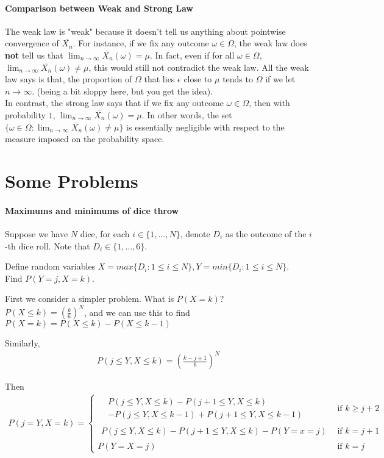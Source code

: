 \documentclass{article}
\begin{document}
\paragraph{Comparison between Weak and Strong Law}
The weak law is "weak" because it doesn't tell us anything about pointwise convergence of $\overline{X_n}$. For instance, if we fix any outcome $\omega \in \Omega$, the weak law does \textbf{not} tell us that $\lim_{n\rightarrow \infty}\overline{X_n}(\omega)=\mu$. In fact, even if for all $\omega \in \Omega$, $\lim_{n\rightarrow \infty}\overline{X_n}(\omega)\neq \mu$, this would still not contradict the weak law. All the weak law says is that, the proportion of $\Omega$ that lies $\epsilon$ close to $\mu$ tends to $\Omega$ if we let $n\rightarrow \infty$. (being a bit sloppy here, but you get the idea).
\\
In contrast, the strong law says that if we fix any outcome $\omega \in \Omega$, then with probability $1$, $\lim_{n\rightarrow \infty}\overline{X_n}(\omega)=\mu$. In other words, the set $\{\omega \in \Omega: \lim_{n\rightarrow \infty}\overline{X_n}(\omega) \neq \mu \}$ is essentially negligible with respect to the measure imposed on the probability space.



\section{Some Problems}
\paragraph{Maximums and minimums of dice throw}
Suppose we have $N$ dice, for each $i\in \{1,\dots,N\}$, denote $D_i$ as the outcome of the $i$-th dice roll. Note that $D_i\in \{1,\dots, 6\}$.

Define random variables $X=max\{D_i:1\leq i\leq N\}, Y=min\{D_i:1\leq i\leq N\}$.\\
Find $P(Y=j, X=k)$.

First we consider a simpler problem. What is $P(X=k)$?\\
$P(X\leq k)=(\frac{k}{6})^N$, and we can use this to find $P(X=k)=P(X\leq k) - P(X\leq k-1)$

Similarly, 
\begin{align*}
	P(j\leq Y, X\leq k)=(\frac{k-j+1}{6})^N
\end{align*}

Then 
\begin{align*}
	P(j=Y, X=k) = 
	\begin{cases}
	\begin{aligned}
	&P(j\leq Y, X\leq k) - P(j+1\leq Y, X\leq k) \\
	&- P(j\leq Y, X\leq k-1) + P(j+1\leq Y, X\leq k-1)
	\end{aligned} &\text{if } k\geq j+2\\
	\begin{aligned}
	P(j\leq Y, X\leq k) - P(j+1\leq Y, X\leq k) - P(Y=x=j)
	\end{aligned} &\text{if } k=j+1\\
	P(Y=X=j) &\text{if } k=j
	\end{cases}
\end{align*}
\end{document}
